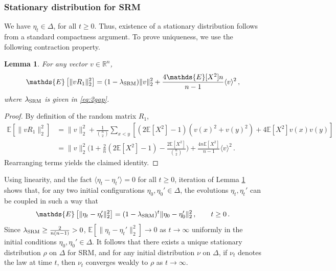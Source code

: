 \documentclass[11pt,reqno]{amsart}
\newtheorem{lemma}[theorem]{Lemma}
\theoremstyle{remark}
\theoremstyle{definition}
\numberwithin{equation}{section}
\numberwithin{figure}{section}
\newcommand{\E}{\mathds{E}}
\newcommand{\R}{\mathbb{R}}
\newcommand{\quadre}[1]{\left[#1\right]}
\let\r=\rho  \let\s=\sigma \let\t=\tau   \let\th=\vartheta
\let\D=\Delta \let\F=\Phi  \let\G=\Gamma  \let\L=\Lambda \let\The=\Theta
\begin{document}
\subsubsection{Stationary distribution for SRM}
We have $\eta_t\in\D$, for all $t\ge 0$. Thus,  existence of a stationary distribution follows from a standard compactness argument. To prove uniqueness, we use the following contraction property. 
\begin{lemma}\label{lem:contra1}
	For any vector $v\in\R^n$, 
	\begin{equation}
		\E\quadre{\|vR_1\|_2^2}=	(1-\lambda_{\rm SRM})\|v\|_2^2+\frac{4\E[X^2]n}{n-1}\langle v\rangle^2\,, 
	\end{equation} 
	where $\lambda_{\rm SRM}$ is given in \eqref{eq:2gap}. 
\end{lemma}
\begin{proof}
By definition of the random matrix  $R_1$,
\begin{align*}
\E\quadre{\|vR_1\|_2^2}&=	\|v\|_2^2 +\frac1{\binom{n}{2}}\sum_{x<y}\left[(2\E[X^2]-1)(v(x)^2+v(y)^2) + 4\E[X^2]v(x)v(y)\right]
\\
& = \|v\|_2^2 \Big(1+\frac2n(2\E[X^2]-1) - \frac{2\E[X^2]}{\binom{n}{2}}\Big) + \frac{4n\E[X^2]}{n-1}\langle v\rangle^2\,.
\end{align*}
Rearranging terms yields the claimed identity. 
\end{proof}
Using linearity, and the fact $ \langle\eta_t-\eta_t' \rangle = 0$ for all $t\ge 0$, iteration of Lemma \ref{lem:contra1} shows that, for any two initial configurations $\eta_0,\eta_0'\in\D$, the evolutions $\eta_t,\eta_t'$ can be coupled in such a way that 
\begin{equation}\label{eq:kmpco}
\E\quadre{\|\eta_t-\eta_t'\|_2^2}	=(1-\lambda_{\rm SRM})^t\|\eta_0-\eta_0'\|_2^2\,, \qquad t\geq 0\,.
\end{equation}
Since $ \lambda_{\rm SRM}\ge \frac{2}{n(n-1)}>0$,   $\E\quadre{\|\eta_t-\eta_t'\|_2^2}
\to 0$ as $t\to\infty$ uniformly in the initial conditions $\eta_0,\eta_0'\in\D$. It follows that there exists a unique stationary distribution $\r$ on $\D$ for SRM, and for any initial distribution $\nu$ on $\D$, if $\nu_t$ denotes the law at time $t$, then $\nu_t$ converges weakly to $\r$ as $t\to\infty$.

   
\end{document}
